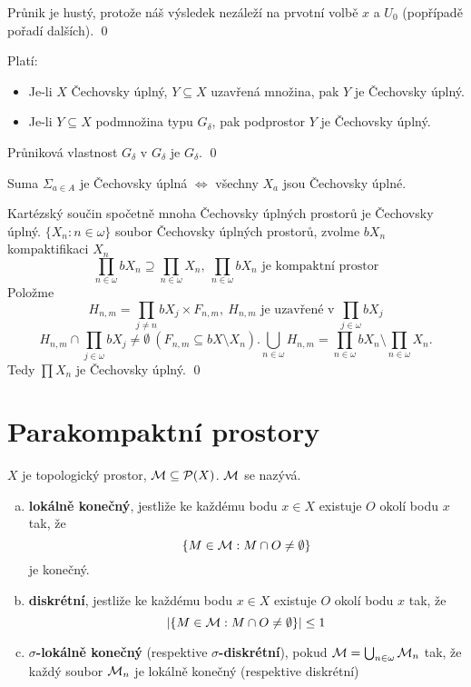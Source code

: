 \documentclass[12pt,a4paper]{article}
\begin{document}
	Průnik je hustý, protože náš výsledek nezáleží na prvotní volbě $x$ a $U_0$
	(popřípadě pořadí dalších).
	\qed

\veta Platí:
\begin{itemize}
	\item Je-li $X$ Čechovsky úplný, $Y \subseteq X$ uzavřená množina, pak $Y$
		je Čechovsky úplný.
	\item Je-li $Y \subseteq X$ podmnožina typu $G_\delta$, pak podprostor $Y$
		je Čechovsky úplný.
\end{itemize}
\dukaz
	Průniková vlastnost $G_\delta$ v $G_\delta$ je $G_\delta$.
	\qed

\veta Suma $\Sigma_{a \in A}$ je Čechovsky úplná $\iff$ všechny $X_a$ jsou
	Čechovsky úplné.

\veta Kartézský součin spočetně mnoha Čechovsky úplných prostorů je Čechovsky úplný.
\dukaz $\{ X_n : n \in \omega \}$ soubor Čechovsky úplných prostorů, zvolme
	$bX_n$ kompaktifikaci $X_n$
		$$\prod_{n \in \omega} bX_n \supseteq \prod_{n \in \omega}
		  X_n,~\prod_{n \in \omega} bX_n \text{ je kompaktní prostor}$$
	Položme
		$$H_{n,m} = \prod_{j \neq n} bX_j \times F_{n,m},~H_{n,m} \text{ je
		  uzavřené v } \prod_{j \in \omega} bX_j$$
		$$H_{n,m} \cap \prod_{j \in \omega} bX_j \neq \emptyset~(F_{n,m}
		  \subseteq bX \setminus X_n). \bigcup_{n \in \omega} H_{n,m} =
		  \prod_{n \in \omega} bX_n \setminus \prod_{n \in \omega} X_n.$$
	Tedy $\prod X_n$ je Čechovsky úplný.
	\qed

\section{Parakompaktní prostory}
 $X$ je topologický prostor, $\mathcal{ M } \subseteq \mathcal{ P }(X)$. $\mathcal{ M }$ se nazývá.
\begin{enumerate}[(a)]
	\item {\bf lokálně konečný}, jestliže ke každému bodu $x \in X$ existuje
	$O$ okolí bodu $x$ tak, že
		$$\{M \in \mathcal{ M } : M \cap O \neq \emptyset \}$$
	je konečný.

	\item {\bf diskrétní}, jestliže ke každému bodu $x \in X$ existuje $O$
	okolí bodu $x$ tak, že
		$$|\{ M \in \mathcal{ M } : M \cap O \neq \emptyset \}| \leq 1$$

	\item {\bf $\sigma$-lokálně konečný} (respektive {\bf $\sigma$-diskrétní}),
		pokud $\mathcal{ M } = \bigcup_{n \in \omega} \mathcal{ M }_n$ tak, že každý soubor $\mathcal{ M }_n$ je lokálně konečný (respektive diskrétní)
\end{enumerate}
\end{document}
